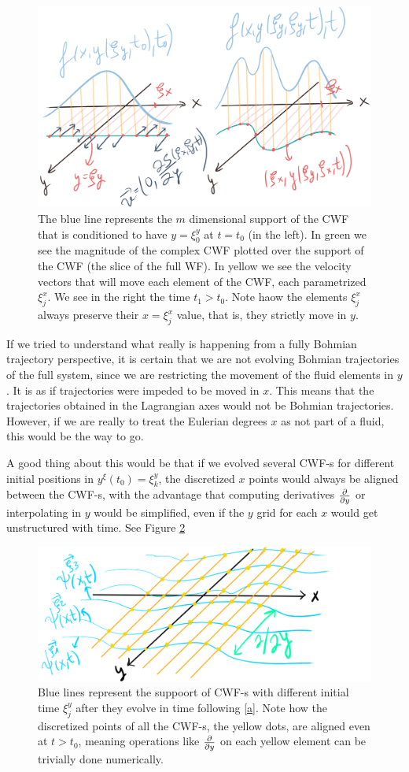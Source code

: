 \documentclass[11pt, a4paper]{article} %
\begin{document}
\begin{figure}[h!]
  \centering
    \includegraphics[width=0.65\linewidth]{unstructure_aligned.png}
  \caption{The blue line represents the $m$ dimensional support of the CWF that is conditioned to have $y=\xi^y_0$ at $t=t_0$ (in the left). In green we see the magnitude of the complex CWF plotted over the support of the CWF (the slice of the full WF). In yellow we see the velocity vectors that will move each element of the CWF, each parametrized $\xi^x_j$. We see in the right the time $t_1>t_0$. Note haow the elements $\xi^x_j$ always preserve their $x=\xi^x_j$ value, that is, they strictly move in $y$. }
  \label{fig:only_y}
\end{figure}

If we tried to understand what really is happening from a fully Bohmian trajectory perspective, it is certain that we are not evolving Bohmian trajectories of the full system, since we are restricting the movement of the fluid elements in $y$. It is as if trajectories were impeded to be moved in $x$. This means that the trajectories obtained in the Lagrangian axes would not be Bohmian trajectories. However, if we are really to treat the Eulerian degrees $x$ as not part of a fluid, this would be the way to go.

A good thing about this would be that if we evolved several CWF-s for different initial positions in $y^\xi(t_0)=\xi^y_k$, the discretized $x$ points would always be aligned between the CWF-s, with the advantage that computing derivatives $\pdv{}{y}$ or interpolating in $y$ would be simplified, even if the $y$ grid for each $x$ would get unstructured with time. See Figure \ref{fig:only_y_grid}

\begin{figure}[h!]
  \centering
    \includegraphics[width=0.65\linewidth]{aligned.png}
  \caption{Blue lines represent the suppoort of CWF-s with different initial time $\xi^y_j$ after they evolve in time following  \eqref{a}. Note how the discretized points of all the CWF-s, the yellow dots, are aligned even at $t>t_0$, meaning operations like $\pdv{}{y}$ on each yellow element can be trivially done numerically. }
  \label{fig:only_y_grid}
\end{figure}
\end{document}
